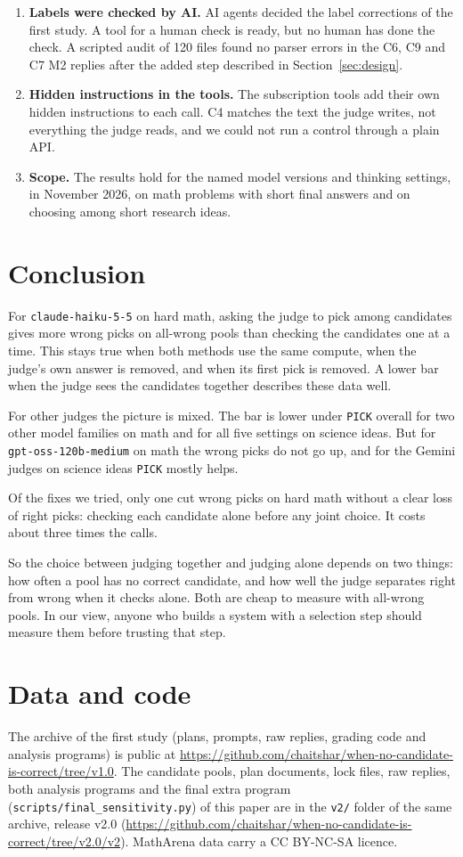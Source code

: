 \documentclass[10pt,twocolumn]{article}
\begin{document}
\begin{enumerate}
\item \textbf{Labels were checked by AI.} AI agents decided the label corrections of the first study. A tool for a human check is ready, but no human has done the check. A scripted audit of 120 files found no parser errors in the C6, C9 and C7 M2 replies after the added step described in Section~\ref{sec:design}.
\item \textbf{Hidden instructions in the tools.} The subscription tools add their own hidden instructions to each call. C4 matches the text the judge writes, not everything the judge reads, and we could not run a control through a plain API.
\item \textbf{Scope.} The results hold for the named model versions and thinking settings, in November 2026, on math problems with short final answers and on choosing among short research ideas.
\end{enumerate}

\section{Conclusion}
For \texttt{claude-haiku-5-5} on hard math, asking the judge to pick among candidates gives more wrong picks on all-wrong pools than checking the candidates one at a time. This stays true when both methods use the same compute, when the judge's own answer is removed, and when its first pick is removed. A lower bar when the judge sees the candidates together describes these data well.

For other judges the picture is mixed. The bar is lower under \texttt{PICK} overall for two other model families on math and for all five settings on science ideas. But for \texttt{gpt-oss-120b-medium} on math the wrong picks do not go up, and for the Gemini judges on science ideas \texttt{PICK} mostly helps.

Of the fixes we tried, only one cut wrong picks on hard math without a clear loss of right picks: checking each candidate alone before any joint choice. It costs about three times the calls.

So the choice between judging together and judging alone depends on two things: how often a pool has no correct candidate, and how well the judge separates right from wrong when it checks alone. Both are cheap to measure with all-wrong pools. In our view, anyone who builds a system with a selection step should measure them before trusting that step.

\section*{Data and code}
The archive of the first study (plans, prompts, raw replies, grading code and analysis programs) is public at \url{https://github.com/chaitshar/when-no-candidate-is-correct/tree/v1.0}. The candidate pools, plan documents, lock files, raw replies, both analysis programs and the final extra program (\texttt{scripts/final\_sensitivity.py}) of this paper are in the \texttt{v2/} folder of the same archive, release v2.0 (\url{https://github.com/chaitshar/when-no-candidate-is-correct/tree/v2.0/v2}). MathArena data carry a CC BY-NC-SA licence.
\end{document}
